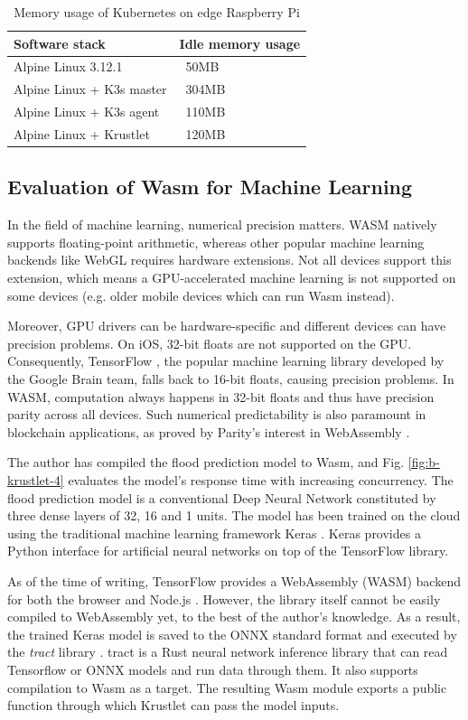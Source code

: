 \begin{table}
\caption{Memory usage of Kubernetes on edge Raspberry Pi}
\begin{tabular}{|l|l|}
\hline
Software stack & Idle memory usage \\
\hline
Alpine Linux 3.12.1 & ~50MB \\
Alpine Linux + K3s master & ~304MB \\
Alpine Linux + K3s agent & ~110MB \\
Alpine Linux + Krustlet & ~120MB \\
\hline
\end{tabular}
\label{tab1}
\end{table}

\subsection{Evaluation of Wasm for Machine Learning}

In the field of machine learning, numerical precision matters. WASM natively supports floating-point arithmetic, whereas other popular machine learning backends like WebGL requires hardware extensions. Not all devices support this extension, which means a GPU-accelerated machine learning is not supported on some devices (e.g. older mobile devices which can run Wasm instead).

Moreover, GPU drivers can be hardware-specific and different devices can have precision problems. On iOS, 32-bit floats are not supported on the GPU. Consequently, TensorFlow \cite{tensorflow}, the popular machine learning library developed by the Google Brain team, falls back to 16-bit floats, causing precision problems. In WASM, computation always happens in 32-bit floats and thus have precision parity across all devices. Such numerical predictability is also paramount in blockchain applications, as proved by Parity's interest in WebAssembly \cite{parity-wasm}.

The author has compiled the flood prediction model to Wasm, and Fig. \ref{fig:b-krustlet-4} evaluates the model's response time with increasing concurrency. The flood prediction model is a conventional Deep Neural Network constituted by three dense layers of 32, 16 and 1 units. The model has been trained on the cloud using the traditional machine learning framework Keras \cite{keras}. Keras provides a Python interface for artificial neural networks on top of the TensorFlow library.

As of the time of writing, TensorFlow provides a WebAssembly (WASM) backend for both the browser and Node.js \cite{tf-wasm}. However, the library itself cannot be easily compiled to WebAssembly yet, to the best of the author's knowledge. As a result, the trained Keras model is saved to the ONNX  \cite{onnx}standard format and executed by the \emph{tract} library \cite{tract}. tract is a Rust neural network inference library that can read Tensorflow or ONNX models and run data through them. It also supports compilation to Wasm as a target. The resulting Wasm module exports a public function through which Krustlet can pass the model inputs. 

